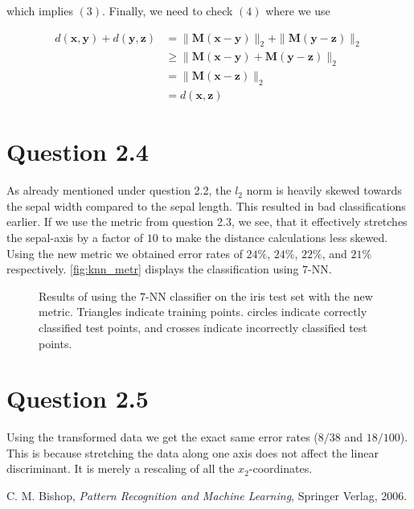 \documentclass[11pt,a4paper]{article}
\begin{document}
which implies $(3)$. Finally, we need to check $(4)$ where we use

\begin{align*}
d(\bm{x}, \bm{y}) + 
d(\bm{y}, \bm{z}) &= \| \bm{M}(\bm{x} - \bm{y}) \|_{2} + \| \bm{M}(\bm{y} - \bm{z}) \|_{2} \\
                  &\geq \| \bm{M}(\bm{x} - \bm{y}) +  \bm{M}(\bm{y} - \bm{z}) \|_{2} \tag{per 8}\\
                  &= \| \bm{M}(\bm{x} - \bm{z}) \|_{2} \\
                  &= d(\bm{x},\bm{z})
\end{align*}


\section{Question 2.4}
As already mentioned under question 2.2, the $l_2$ norm is heavily skewed
towards the sepal width compared to the sepal length. This resulted in bad
classifications earlier. If we use the metric from question 2.3, we see, that
it effectively stretches the sepal-axis by a factor of $10$ to make the
distance calculations less skewed. Using the new metric we obtained error rates
of $24\%$, $24\%$, $22\%$, and $21\%$ respectively. \autoref{fig:knn_metr}
displays the classification using $7$-NN.

\begin{figure}[htbp]
    \centering
    \caption{Results of using the $7$-NN classifier on the iris test set with
    the new metric. Triangles indicate training points. circles indicate
    correctly classified test points, and crosses indicate incorrectly classified
    test points.}
    \label{fig:knn_metr}
\end{figure}

\section{Question 2.5}
Using the transformed data we get the exact same error rates ($8/38$ and
$18/100$). This is because stretching the data along one axis does not affect
the linear discriminant. It is merely a rescaling of all the $x_2$-coordinates.



\begin{thebibliography}{9}
        C. M. Bishop,
        \emph{Pattern Recognition and Machine Learning},
        Springer Verlag,
        2006.
\end{thebibliography}
\end{document}
